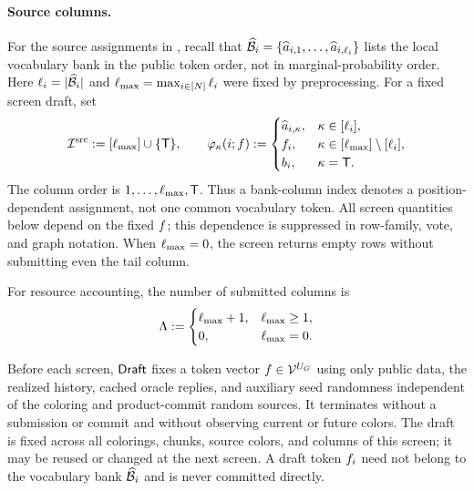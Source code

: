 \paragraph{Source columns.}
For the source assignments in , recall that
$\widehat{\mathcal B}_{i}=\{\widehat a_{i,1},\ldots,\widehat a_{i,\ell_{i}}\}$
lists the local vocabulary bank in the public token order, not in
marginal-probability order.
Here $\ell_{i}=|\widehat{\mathcal B}_{i}|$ and
$\ell_{\max}=\max_{i\in[N]}\ell_{i}$ were fixed by preprocessing.
For a fixed screen draft, set
\begin{equation}
 \mathcal I^{\mathrm{src}}:=[\ell_{\max}]\cup\{\mathsf T\},
 \qquad
 \varphi_{\kappa}(i;f)
 :=\begin{cases}
 \widehat a_{i,\kappa},&\kappa\in[\ell_{i}],\\
 f_{i},&\kappa\in[\ell_{\max}]\setminus[\ell_{i}],\\
 b_{i},&\kappa=\mathsf T.
 \end{cases}
 \label{app:eq:packed-column}
\end{equation}
The column order is $1,\ldots,\ell_{\max},\mathsf T$.
Thus a bank-column index denotes a position-dependent assignment, not one
common vocabulary token.  All screen quantities below depend on the fixed
$f$; this dependence is suppressed in row-family, vote, and graph
notation.  When $\ell_{\max}=0$, the screen returns empty rows without
submitting even the tail column.

For resource accounting, the number of submitted columns is
\begin{equation}
 \Lambda:=
 \begin{cases}
 \ell_{\max}+1,&\ell_{\max}\ge1,\\
 0,&\ell_{\max}=0.
 \end{cases}
 \label{app:eq:screen-column-count}
\end{equation}




\begin{definition}
\label{app:def:draft-generator}
Before each screen, $\mathsf{Draft}$ fixes a token vector
$f\in\mathcal V^{U_{G}}$ using only public data,
the realized history, cached oracle replies, and auxiliary seed randomness
independent of the coloring and product-commit random sources. It terminates
without a submission or commit and without observing current or future
colors. The draft is fixed across all colorings, chunks, source colors,
and columns of this screen; it may be reused or changed at the next screen.
A draft token $f_{i}$ need not belong to the vocabulary bank
$\widehat{\mathcal B}_{i}$ and is never committed directly.
\end{definition}

